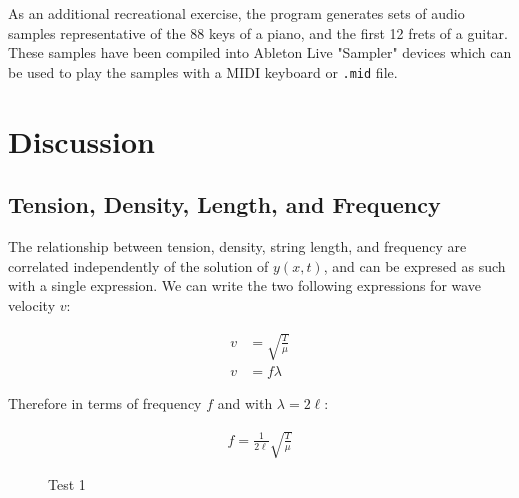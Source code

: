 \documentclass[%
 reprint,
 amsmath,amssymb,
 aps,
]{revtex4-1}
\begin{document}
As an additional recreational exercise, the program generates sets of audio samples representative of the 88 keys of a piano, and the first 12 frets of a guitar. These samples have been compiled into Ableton Live "Sampler" devices which can be used to play the samples with a MIDI keyboard or \texttt{.mid} file.\\

\section{\label{sec:level1}Discussion}



\subsection{\label{sec:level1}Tension, Density, Length, and Frequency}
The relationship between tension, density, string length, and frequency are correlated independently of the solution of $y(x,t)$, and can be expresed as such with a single expression. We can write the two following expressions for wave velocity $v$:

\begin{align}
v &= \sqrt{\frac{T}{\mu}}\\
v &= f \lambda
\end{align}

Therefore in terms of frequency $f$ and with $\lambda = 2 \ell$:

\begin{align} \label{duh}
f = \frac{1}{2\ell} \sqrt{\frac{T}{\mu}}
\end{align}

\begin{figure}[h]
\caption{Test 1}
\label{Test1}
\end{figure}
\end{document}
